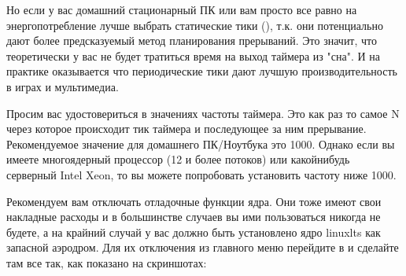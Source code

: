 \documentclass[letterpaper,10pt,russian,openany]{sphinxmanual}
\begin{document}
\sphinxAtStartPar
Но если у вас домашний стационарный ПК или вам просто все равно на энергопотребление \sphinxhyphen{} лучше выбрать статические тики (),
т.к. они потенциально дают более предсказуемый метод планирования прерываний.
Это значит, что теоретически у вас не будет тратиться время на выход таймера из "сна".
И на практике оказывается что периодические тики дают лучшую производительность в играх и мультимедиа.

\sphinxAtStartPar
{}

\noindent{}

\sphinxAtStartPar
{}

\noindent{}

\sphinxAtStartPar
{}

\noindent{}

\sphinxAtStartPar
{}

\noindent{}

\sphinxAtStartPar
{} Просим вас удостовериться в значениях частоты таймера.
Это как раз то самое N через которое происходит тик таймера и последующее за ним прерывание.
Рекомендуемое значение для домашнего ПК/Ноутбука это 1000.
Однако если вы имеете многоядерный процессор (12 и более потоков) или какой\sphinxhyphen{}нибудь серверный Intel Xeon,
то вы можете попробовать установить частоту ниже 1000.

\sphinxAtStartPar
{}

\noindent{}

\sphinxAtStartPar
{}

\noindent{}

\sphinxAtStartPar
{}

\noindent{}

\sphinxAtStartPar
{} Рекомендуем вам отключать отладочные функции ядра. Они тоже имеют свои накладные расходы и в большинстве случаев
вы ими пользоваться никогда не будете, а на крайний случай у вас должно быть установлено ядро linux\sphinxhyphen{}lts как запасной аэродром.
Для их отключения из главного меню перейдите в  и сделайте там все так, как показано на скриншотах:
\end{document}
